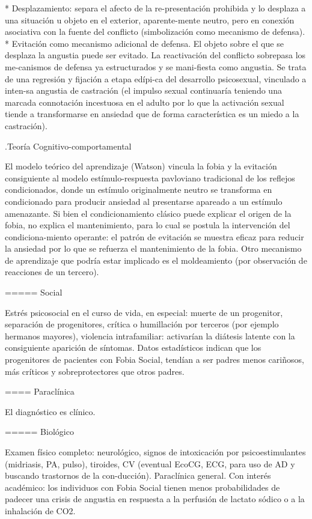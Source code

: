 \documentclass{scrbook}
\begin{document}
* Desplazamiento: separa el afecto de la re-presentación prohibida y lo desplaza a una situación u objeto en el exterior, aparente-mente neutro, pero en conexión asociativa con la fuente del conflicto (simbolización como mecanismo de defensa).
* Evitación como mecanismo adicional de defensa. El objeto sobre el que se desplaza la angustia puede ser evitado. La reactivación del conflicto sobrepasa los me-canismos de defensa ya estructurados y se mani-fiesta como angustia. Se trata de una regresión y fijación a etapa edípi-ca del desarrollo psicosexual, vinculado a inten-sa angustia de castración (el impulso sexual continuaría teniendo una marcada connotación incestuosa en el adulto por lo que la activación sexual tiende a transformarse en ansiedad que de forma característica es un miedo a la castración).

.Teoría Cognitivo-comportamental

El modelo teórico del aprendizaje (Watson) vincula la fobia y la evitación consiguiente al modelo estímulo-respuesta pavloviano tradicional de los reflejos condicionados, donde un estímulo originalmente neutro se transforma en condicionado para producir ansiedad al presentarse apareado a un estímulo amenazante. Si bien el condicionamiento clásico puede explicar el origen de la fobia, no explica el mantenimiento, para lo cual se postula la intervención del condiciona-miento operante: el patrón de evitación se muestra eficaz para reducir la ansiedad por lo que se refuerza el mantenimiento de la fobia. Otro mecanismo de aprendizaje que podría estar implicado es el moldeamiento (por observación de reacciones de un tercero).

===== Social

Estrés psicosocial en el curso de vida, en especial: muerte de un progenitor, separación de progenitores, crítica o humillación por terceros (por ejemplo hermanos mayores), violencia intrafamiliar: activarían la diátesis latente con la consiguiente aparición de síntomas. Datos estadísticos indican que los progenitores de pacientes con Fobia Social, tendían a ser padres menos cariñosos, más críticos y sobreprotectores que otros padres.

==== Paraclínica

El diagnóstico es clínico.

===== Biológico

Examen físico completo: neurológico, signos de intoxicación por psicoestimulantes (midriasis, PA, pulso), tiroides, CV (eventual EcoCG, ECG, para uso de AD y buscando trastornos de la con-ducción). Paraclínica general. Con interés académico: los individuos con Fobia Social tienen menos probabilidades de padecer una crisis de angustia en respuesta a la perfusión de lactato sódico o a la inhalación de CO2.
\end{document}
